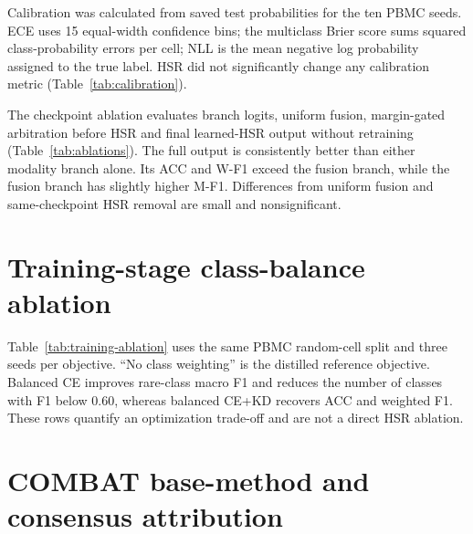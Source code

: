 \documentclass[10pt]{article}
\begin{document}
Calibration was calculated from saved test probabilities for the ten PBMC seeds. ECE uses 15 equal-width confidence bins; the multiclass Brier score sums squared class-probability errors per cell; NLL is the mean negative log probability assigned to the true label. HSR did not significantly change any calibration metric (Table~\ref{tab:calibration}).

\begin{table}[H]
\centering
\caption{PBMC calibration with and without learned HSR. Lower values are better.}
\label{tab:calibration}
\small

\end{table}

The checkpoint ablation evaluates branch logits, uniform fusion, margin-gated arbitration before HSR and final learned-HSR output without retraining (Table~\ref{tab:ablations}). The full output is consistently better than either modality branch alone. Its ACC and W-F1 exceed the fusion branch, while the fusion branch has slightly higher M-F1. Differences from uniform fusion and same-checkpoint HSR removal are small and nonsignificant.

\begin{table}[H]
\centering
\caption{Full margin-gated learned-HSR output minus inference-time ablation variants over ten PBMC checkpoints.}
\label{tab:ablations}
\scriptsize

\end{table}

\section{Training-stage class-balance ablation}

Table~\ref{tab:training-ablation} uses the same PBMC random-cell split and three seeds per objective. ``No class weighting'' is the distilled reference objective. Balanced CE improves rare-class macro F1 and reduces the number of classes with F1 below 0.60, whereas balanced CE+KD recovers ACC and weighted F1. These rows quantify an optimization trade-off and are not a direct HSR ablation.

\begin{table}[H]
\centering
\caption{Three-seed PBMC training-stage ablation.}
\label{tab:training-ablation}
\small

\end{table}

\section{COMBAT base-method and consensus attribution}
\end{document}

